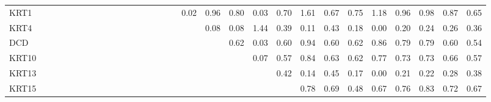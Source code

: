 \begin{longtable}{lrrrrrrrrrrrrrrrrrrrrrrrrrrrrr}
KRT1    &            &            &           &              &             &              &              &            &              &            &              &             &             &            &            &            &       0.02 &      0.96 &        0.80 &        0.03 &        0.70 &        1.61 &        0.67 &       0.75 &         1.18 &         0.96 &       0.98 &          0.87 &         0.65 \\
KRT4    &            &            &           &              &             &              &              &            &              &            &              &             &             &            &            &            &            &      0.08 &        0.08 &        1.44 &        0.39 &        0.11 &        0.43 &       0.18 &         0.00 &         0.20 &       0.24 &          0.26 &         0.36 \\
DCD     &            &            &           &              &             &              &              &            &              &            &              &             &             &            &            &            &            &           &        0.62 &        0.03 &        0.60 &        0.94 &        0.60 &       0.62 &         0.86 &         0.79 &       0.79 &          0.60 &         0.54 \\
KRT10   &            &            &           &              &             &              &              &            &              &            &              &             &             &            &            &            &            &           &             &        0.07 &        0.57 &        0.84 &        0.63 &       0.62 &         0.77 &         0.73 &       0.73 &          0.66 &         0.57 \\
KRT13   &            &            &           &              &             &              &              &            &              &            &              &             &             &            &            &            &            &           &             &             &        0.42 &        0.14 &        0.45 &       0.17 &         0.00 &         0.21 &       0.22 &          0.28 &         0.38 \\
KRT15   &            &            &           &              &             &              &              &            &              &            &              &             &             &            &            &            &            &           &             &             &             &        0.78 &        0.69 &       0.48 &         0.67 &         0.76 &       0.83 &          0.72 &         0.67 \\

\end{longtable}

